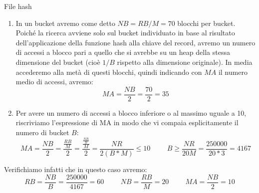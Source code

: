 \begin{Example}{File hash}{}
\begin{enumerate}[label=(\alph*)]
        \item In un bucket avremo come detto $NB = RB/M = 70$ blocchi per bucket. Poiché la ricerca avviene solo sul bucket individuato in base al risultato dell'applicazione della funzione hash alla chiave del record, avremo un numero di accessi a blocco pari a quello che si avrebbe su un heap della stessa dimensione del bucket (cioè $1/B$ rispetto alla dimensione originale). In media accederemo alla metà di questi blocchi, quindi indicando con $MA$ il numero medio di accessi, avremo:
        \begin{equation*}
            MA=\frac{NB}{2}=\frac{70}{2}=35
        \end{equation*}

        \item Per avere un numero di accessi a blocco inferiore o al massimo uguale a 10, riscriviamo l'espressione di MA in modo che vi compaia esplicitamente il numero di bucket $B$:
        \begin{equation*}
            MA=\frac{NB}{2}=\frac{\frac{RB}{M}}{2}=\frac{\frac{\frac{NR}{B}}{M}}{2}=\frac{NR}{2(B*M)}\leq10\hspace{1cm}B\geq\frac{NR}{20M}=\frac{250000}{20*3}=4167
        \end{equation*}
    \end{enumerate}
    Verifichiamo infatti che in questo caso avremo:
    \begin{equation*}
        RB=\frac{NB}{B}=\frac{250000}{4167}=60\hspace{1cm}NB=\frac{RB}{M}=20\hspace{1cm}MA=\frac{NB}{2}=10
    \end{equation*}
\end{Example}

